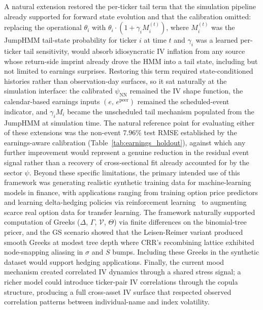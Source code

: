 A natural extension restored the per-ticker tail term that the simulation pipeline already supported for forward state evolution and that the calibration omitted: replacing the operational $\theta_i$ with $\theta_i \cdot (1 + \gamma_i M_i^{(t)})$, where $M_i^{(t)}$ was the JumpHMM tail-state probability for ticker $i$ at time $t$ and $\gamma_i$ was a learned per-ticker tail sensitivity, would absorb idiosyncratic IV inflation from any source whose return-side imprint already drove the HMM into a tail state, including but not limited to earnings surprises. Restoring this term required state-conditioned histories rather than observation-day surfaces, so it sat naturally at the simulation interface: the calibrated $\psi_{\text{NN}}$ remained the IV shape function, the calendar-based earnings inputs $(e,\,e^{\text{peer}})$ remained the scheduled-event indicator, and $\gamma_i M_i$ became the unscheduled tail mechanism populated from the JumpHMM at simulation time. The natural reference point for evaluating either of these extensions was the non-event $7.96\%$ test RMSE established by the earnings-aware calibration (Table~\ref{tab:earnings_holdout}), against which any further improvement would represent a genuine reduction in the residual event signal rather than a recovery of cross-sectional fit already accounted for by the sector $\psi$. Beyond these specific limitations, the primary intended use of this framework was generating realistic synthetic training data for machine-learning models in finance, with applications ranging from training option price predictors and learning delta-hedging policies via reinforcement learning~\cite{buehler2019} to augmenting scarce real option data for transfer learning. The framework naturally supported computation of Greeks ($\Delta$, $\Gamma$, $\mathcal{V}$, $\Theta$) via finite differences on the binomial-tree pricer, and the GS scenario showed that the Leisen-Reimer variant produced smooth Greeks at modest tree depth where CRR's recombining lattice exhibited node-snapping aliasing in $\sigma$ and $S$ bumps. Including these Greeks in the synthetic dataset would support hedging applications. Finally, the current mood mechanism created correlated IV dynamics through a shared stress signal; a richer model could introduce ticker-pair IV correlations through the copula structure, producing a full cross-asset IV surface that respected observed correlation patterns between individual-name and index volatility.
